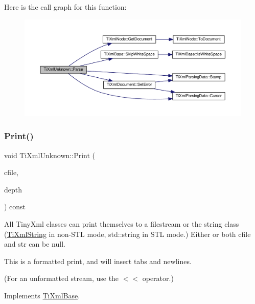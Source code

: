 Here is the call graph for this function\+:
\nopagebreak
\begin{figure}[H]
\begin{center}
\leavevmode
\includegraphics[width=350pt]{class_ti_xml_unknown_aa51c2694e4177b5f0b5429ee5a81b58d_cgraph}
\end{center}
\end{figure}
\mbox{\label{class_ti_xml_unknown_a5793fbc48ab3419783c0e866ca2d334e}} 
\subsubsection{\texorpdfstring{Print()}{Print()}}
{\footnotesize\ttfamily void Ti\+Xml\+Unknown\+::\+Print (\begin{DoxyParamCaption}\item[{F\+I\+LE $\ast$}]{cfile,  }\item[{int}]{depth }\end{DoxyParamCaption}) const\hspace{0.3cm}{\ttfamily [virtual]}}

All Tiny\+Xml classes can print themselves to a filestream or the string class (\hyperlink{class_ti_xml_string}{Ti\+Xml\+String} in non-\/\+S\+TL mode, std\+::string in S\+TL mode.) Either or both cfile and str can be null.

This is a formatted print, and will insert tabs and newlines.

(For an unformatted stream, use the $<$$<$ operator.) 

Implements \hyperlink{class_ti_xml_base_a0de56b3f2ef14c65091a3b916437b512}{Ti\+Xml\+Base}.

\mbox{\label{class_ti_xml_unknown_a0d08dc16fc9ce16140ccaefbc35f6ea6}} 
